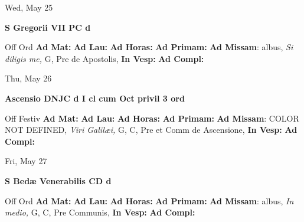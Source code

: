 \documentclass[10pt]{memoir}
\begin{document}
\begin{center}
\begin{minipage}{3.5in}
\vspace{2em}
\begin{center}Wed, May 25
\end{center}
\textbf{ \large S Gregorii VII PC
\textnormal{\normalsize d}}

\begin{justify}Off Ord
\textbf{Ad Mat: }
\textbf{Ad Lau: }
\textbf{Ad Horas: }
\textbf{Ad Primam: }\textbf{Ad Missam}: albus, \textit{Si diligis me,} G, Pre de Apostolis, 
\textbf{In Vesp: }
\textbf{Ad Compl: }
\end{justify}
\end{minipage}
\end{center}

\begin{center}
\begin{minipage}{3.5in}
\vspace{2em}
\begin{center}Thu, May 26
\end{center}
\textbf{ \large Ascensio DNJC
\textnormal{\normalsize d I cl cum Oct privil 3 ord}}

\begin{justify}Off Festiv
\textbf{Ad Mat: }
\textbf{Ad Lau: }
\textbf{Ad Horas: }
\textbf{Ad Primam: }\textbf{Ad Missam}: COLOR NOT DEFINED, \textit{Viri Galilæi,} G, C, Pre et Comm de Ascensione, 
\textbf{In Vesp: }
\textbf{Ad Compl: }
\end{justify}
\end{minipage}
\end{center}

\begin{center}
\begin{minipage}{3.5in}
\vspace{2em}
\begin{center}Fri, May 27
\end{center}
\textbf{ \large S Bedæ Venerabilis CD
\textnormal{\normalsize d}}

\begin{justify}Off Ord
\textbf{Ad Mat: }
\textbf{Ad Lau: }
\textbf{Ad Horas: }
\textbf{Ad Primam: }\textbf{Ad Missam}: albus, \textit{In medio,} G, C, Pre Communis, 
\textbf{In Vesp: }
\textbf{Ad Compl: }
\end{justify}
\end{minipage}
\end{center}
\end{document}
